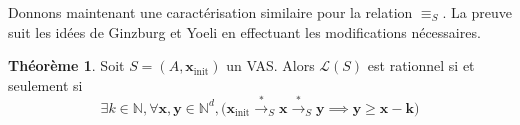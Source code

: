 \documentclass[a4paper,final]{article}
\theoremstyle{definition}
\newtheorem{Theorem}{Théorème}
\let\geq\geqslant
\newcommand{\N}{\ensuremath{\mathbb{N}}}
\newcommand{\lang}{\ensuremath{\mathcal{L}}}
\newcommand{\trans}[2]{\ensuremath{\stackrel{#1}{\longrightarrow}_{#2}}}
\newcommand{\vect}[1]{\ensuremath{\mathbf{#1}}}
\newcommand{\rel}{\ensuremath{\equiv}}
\newcommand{\xinit}{\ensuremath{\vect{x}_\text{init}}}
\begin{document}
\vspace{5mm}

Donnons maintenant une caractérisation similaire pour la relation $\rel_S$.
La preuve suit les idées de Ginzburg et Yoeli \cite{giyo80} en effectuant les modifications nécessaires.

\begin{Theorem}\label{caractérisation}
    Soit $S=(A,\xinit)$ un VAS.
    Alors $\lang(S)$ est rationnel si et seulement si
    \begin{equation}
        \exists k\in\N, \forall \vect{x},\vect{y}\in\N^d, 
\big( \xinit\trans{*}{S} \vect{x} \trans{*}{S} \vect{y}\implies
\vect{y}\geq \vect{x} -\vect{k} \big)
    \label{eq:caracterisation}
    \end{equation}
\end{Theorem}
\end{document}
